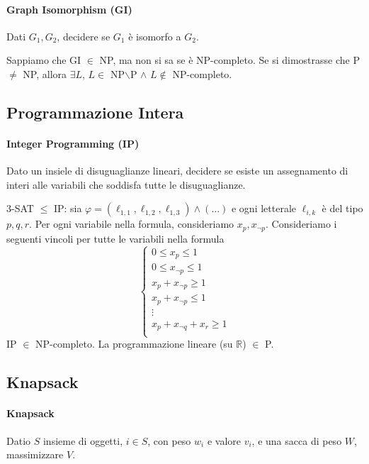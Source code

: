 \paragraph{Graph Isomorphism (GI)} Dati $G_1,G_2$, decidere se $G_1$ è isomorfo a $G_2$.\medskip

Sappiamo che GI $\in$ NP, ma non si sa se è NP-completo. Se si dimostrasse che P $\neq$ NP, allora $\exists L$, $L\in$ NP$\backslash$P $\land$ $L\not\in$ NP-completo.



\subsection{Programmazione Intera}
\paragraph{Integer Programming (IP)} Dato un insiele di disuguaglianze lineari, decidere se esiste un assegnamento di interi alle variabili che soddisfa tutte le disuguaglianze.\medskip

3-SAT $\leq$ IP: sia $\varphi=(\ell_{1,1},\ell_{1,2},\ell_{1,3})\land(\dots)$ e ogni letterale $\ell_{i,k}$ è del tipo $p,q,r$. Per ogni variabile nella formula, consideriamo $x_p,x_{\lnot p}$. Consideriamo i seguenti vincoli per tutte le variabili nella formula
$$
\begin{cases*}
    0\leq x_p\leq 1 \\
    0\leq x_{\lnot p}\leq 1 \\
    x_p+x_{\lnot p}\geq 1 \\
    x_p+x_{\lnot p}\leq 1 \\
    \vdots \\
    x_p+x_{\lnot q}+x_r\geq 1 \\
\end{cases*}
$$
IP $\in$ NP-completo. La programmazione lineare (su $\mathbb{R}$) $\in$ P.



\subsection{Knapsack}
\paragraph{Knapsack} Datio $S$ insieme di oggetti, $i\in S$, con peso $w_i$ e valore $v_i$, e una sacca di peso $W$, massimizzare $V$.\medskip

